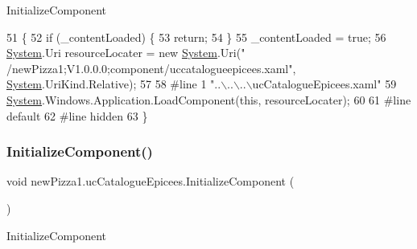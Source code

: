 Initialize\+Component 


\begin{DoxyCode}
51                                           \{
52             \textcolor{keywordflow}{if} (\_contentLoaded) \{
53                 \textcolor{keywordflow}{return};
54             \}
55             \_contentLoaded = \textcolor{keyword}{true};
56             \hyperlink{namespaceSystem}{System}.Uri resourceLocater = \textcolor{keyword}{new} \hyperlink{namespaceSystem}{System}.Uri(\textcolor{stringliteral}{"
      /newPizza1;V1.0.0.0;component/uccatalogueepicees.xaml"}, \hyperlink{namespaceSystem}{System}.UriKind.Relative);
57             
58 \textcolor{preprocessor}{            #line 1 "..\(\backslash\)..\(\backslash\)..\(\backslash\)ucCatalogueEpicees.xaml"}
59             \hyperlink{namespaceSystem}{System}.Windows.Application.LoadComponent(\textcolor{keyword}{this}, resourceLocater);
60             
61 \textcolor{preprocessor}{            #line default}
62 \textcolor{preprocessor}{            #line hidden}
63         \}
\end{DoxyCode}
\mbox{\label{classnewPizza1_1_1ucCatalogueEpicees_a88c609f29d5b46d57c31019576f8d7d8}} 
\subsubsection{\texorpdfstring{Initialize\+Component()}{InitializeComponent()}\hspace{0.1cm}{\footnotesize\ttfamily [4/6]}}
{\footnotesize\ttfamily void new\+Pizza1.\+uc\+Catalogue\+Epicees.\+Initialize\+Component (\begin{DoxyParamCaption}{ }\end{DoxyParamCaption})\hspace{0.3cm}{\ttfamily [inline]}}



Initialize\+Component 


